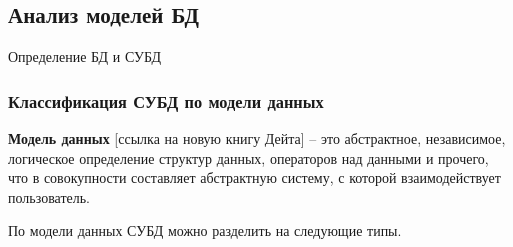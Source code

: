 \clearpage



\subsection{Анализ моделей БД}

Определение БД и СУБД

\subsubsection{Классификация СУБД по модели данных}

\textbf{Модель данных} [ссылка на новую книгу Дейта] – это абстрактное, независимое, логическое определение структур
данных, операторов над данными и прочего, что в совокупности составляет абстрактную систему, с которой взаимодействует пользователь.

По модели данных СУБД можно разделить на следующие типы.



